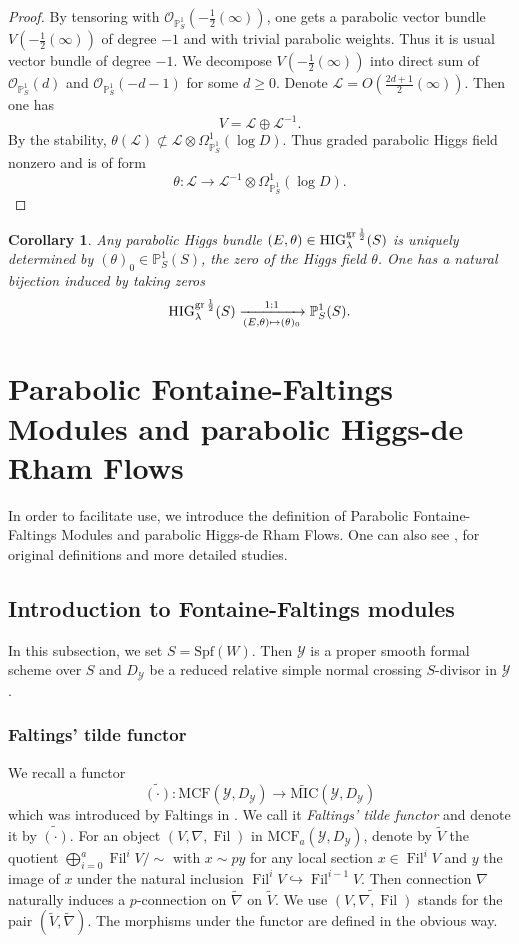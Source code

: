 \documentclass[12pt,twoside]{book}
\theoremstyle{plain}
\newtheorem{corollary}[corollary]{Corollary}
\theoremstyle{definition}
\theoremstyle{remark}
\newcommand{\bP}{{\mathbb P}}
\newcommand{\mL}{{\mathcal L}}
\newcommand{\mO}{{\mathcal O}}
\newcommand{\mY}{{\mathcal Y}}
\DeclareMathOperator\Fil{Fil}
\newcommand{\MCF}{\mathrm{MCF}}
\newcommand{\MIC}{\mathrm{MIC}}
\numberwithin{equation}{section}
\def\High{{\mathrm{HIG}^{{\rm gr}\,{1\over 2}}_{\lambda}}}
\begin{document}
\begin{proof}
By tensoring with $\mO_{\bP^1_S}(-\frac12(\infty))$, one gets a parabolic vector bundle $V(-\frac12(\infty))$ of degree $-1$ and with trivial parabolic weights. Thus it is usual vector bundle of degree $-1$. We decompose $V(-\frac12(\infty))$ into direct sum of $\mO_{\bP^1_S}(d)$ and $\mO_{\bP^1_S}(-d-1)$ for some $d\geq0$. Denote $\mL=O(\frac{2d+1}2(\infty))$. Then one has
\[V = \mL\oplus \mL^{-1}.\]
By the stability, $\theta(\mL)\not\subset \mL\otimes \Omega^1_{\bP^1_S}(\log D)$. Thus graded parabolic Higgs field nonzero and is of form
\[\theta\colon \mL \rightarrow \mL^{-1}\otimes\Omega^1_{\bP^1_S}(\log D).\]
\end{proof}

\begin{corollary}\label{thm_Higgs0ProjLine} Any parabolic Higgs bundle $(E,\theta)\in \High(S)$ is uniquely determined by $(\theta)_0 \in \bP^1_S(S)$, the zero of the Higgs field $\theta$. One has a natural bijection induced by taking zeros
\[\High(S) \xrightarrow[(E,\theta)\mapsto (\theta)_0]{1:1} \bP^1_S(S).\]
\end{corollary}

\newpage

\section {\bf Parabolic Fontaine-Faltings Modules and parabolic Higgs-de Rham Flows} \label{sec_main_FF_and_Higgs_de_Rham}

In order to facilitate use, we introduce the definition of Parabolic Fontaine-Faltings Modules and parabolic Higgs-de Rham Flows. One can also see \cite{KrSh20}, for original definitions and more detailed studies.

\subsection{Introduction to Fontaine-Faltings modules}

In this subsection, we set $S=\mathrm{Spf}(W)$. Then $\mY$ is a proper smooth formal scheme over $S$ and $D_\mY$ be a reduced relative simple normal crossing $S$-divisor in $\mY$.

\subsubsection{Faltings' tilde functor   } 
We recall a functor
\[\widetilde{(\cdot)}\colon \MCF(\mY,D_\mY) \rightarrow \widetilde{\MIC}(\mY,D_\mY)\]
which was introduced by Faltings in \cite{Fal89}. We call it \emph{Faltings' tilde functor} and denote it by \emph{$\widetilde{(\cdot)}$}. For an object $(V,\nabla,\Fil)$ in $\MCF_{a}(\mY,D_\mY)$, denote by $\widetilde{V}$ the quotient $\bigoplus\limits_{i=0}^{a}\Fil^iV/\sim$ with $x\sim py$ for any local section $x\in\Fil^iV$ and $y$ the image of $x$ under the natural inclusion $\Fil^iV\hookrightarrow\Fil^{i-1}V$. Then connection $\nabla$ naturally induces a $p$-connection on $\widetilde{\nabla}$ on $\widetilde{V}$. We use $\widetilde{(V,\nabla,\Fil)}$ stands for the pair $(\widetilde{V},\widetilde{\nabla})$. The morphisms under the functor are defined in the obvious way.
\end{document}
